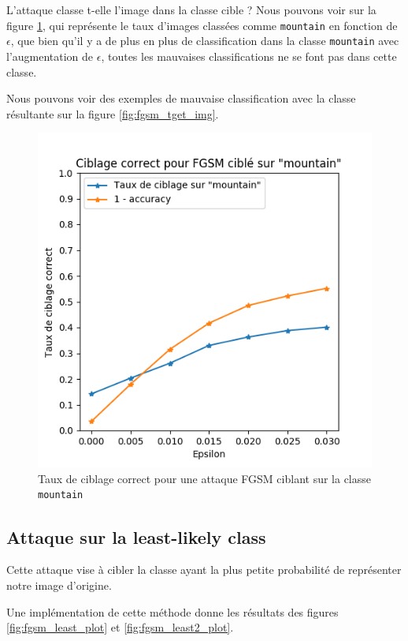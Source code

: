 \documentclass[10pt,twocolumn,letterpaper]{article}
\begin{document}
L'attaque classe t-elle l'image dans la classe cible ? Nous pouvons voir sur la figure \ref{fig:fgsm_tget2_plot}, qui représente le taux d'images classées comme \texttt{mountain} en fonction de $\epsilon$, que bien qu'il y a de plus en plus de classification dans la classe \texttt{mountain} avec l'augmentation de $\epsilon$, toutes les mauvaises classifications ne se font pas dans cette classe.

Nous pouvons voir des exemples de mauvaise classification avec la classe résultante sur la figure \ref{fig:fgsm_tget_img}.

\begin{figure}[!h]
\begin{center}
\includegraphics[width=0.85\linewidth]{ressources/fgsm_tget2_plot.png}
\end{center}
   \caption{Taux de ciblage correct pour une attaque FGSM ciblant sur la classe \texttt{mountain}}
\label{fig:fgsm_tget2_plot}
\end{figure}

\subsection{Attaque sur la least-likely class}
Cette attaque vise à cibler la classe ayant la plus petite probabilité de représenter notre image d'origine.

Une implémentation de cette méthode donne les résultats des figures \ref{fig:fgsm_least_plot} et \ref{fig:fgsm_least2_plot}.
\end{document}
